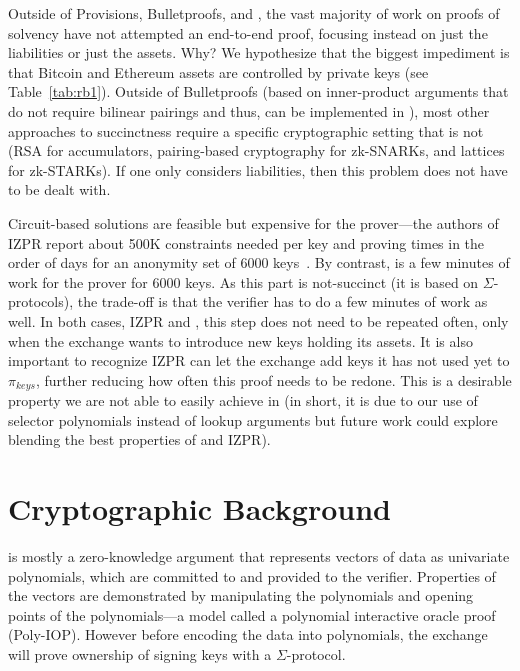 Outside of Provisions, Bulletproofs, and \Sys, the vast majority of work on proofs of solvency have not attempted an end-to-end proof, focusing instead on just the liabilities or just the assets. Why? We hypothesize that the biggest impediment is that Bitcoin and Ethereum assets are controlled by \secp private keys (see Table~\ref{tab:rb1}). Outside of Bulletproofs (based on inner-product arguments that do not require bilinear pairings and thus, can be implemented in \secp), most other approaches to succinctness require a specific cryptographic setting that is not \secp (\ie RSA for accumulators, pairing-based cryptography for zk-SNARKs, and lattices for zk-STARKs). If one only considers liabilities, then this problem does not have to be dealt with.

Circuit-based solutions are feasible but expensive for the prover---the authors of IZPR report about 500K constraints needed per key and proving times in the order of days for an anonymity set of 6000 keys~\cite{izpr}. By contrast, \Sys is a few minutes of work for the prover for 6000 keys. As this part is not-succinct (it is based on $\Sigma$-protocols), the trade-off is that the verifier has to do a few minutes of work as well. In both cases, IZPR and \Sys, this step does not need to be repeated often, only when the exchange wants to introduce new keys holding its assets. It is also important to recognize IZPR can let the exchange add keys it has not used yet to $\pi_{keys}$, further reducing how often this proof needs to be redone. This is a desirable property we are not able to easily achieve in \Sys (in short, it is due to our  use of selector polynomials instead of lookup arguments but future work could explore blending the best properties of \Sys and IZPR). 


\section{Cryptographic Background}

\Sys is mostly a zero-knowledge argument that represents vectors of data as univariate polynomials, which are committed to and provided to the verifier. Properties of the vectors are demonstrated by manipulating the polynomials and opening points of the polynomials---a model called a polynomial interactive oracle proof (Poly-IOP). However before encoding the data into polynomials, the exchange will prove ownership of signing keys with a $\Sigma$-protocol.

